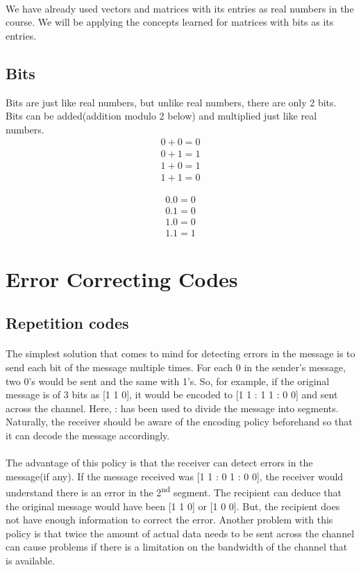 \documentclass[11pt,a4paper]{article}
\begin{document}
\paragraph{}
We have already used vectors and matrices with its entries as real numbers in the course. We will be applying the concepts learned for matrices with bits as its entries. 
\subsection{Bits}
Bits are just like real numbers, but unlike real numbers, there are only 2 bits. Bits can be added(addition modulo 2 below) and multiplied just like real numbers.\\
$$
\begin{aligned}
    0 + 0 = 0\\
    0 + 1 = 1\\
    1 + 0 = 1\\
    1 + 1 = 0
\end{aligned}
\label{eq: logical 1}
$$

$$
\begin{aligned}
    0.0 = 0\\
    0.1 = 0\\
    1.0 = 0\\
    1.1 = 1
\end{aligned}
\label{eq: logical 1}
$$

\section{Error Correcting Codes}

\subsection{Repetition codes}
\paragraph{}
The simplest solution that comes to mind for detecting errors in the message is to send each bit of the message multiple times. For each 0 in the sender's message, two 0's would be sent and the same with 1's. So, for example, if the original message is of 3 bits as [1 1 0], it would be encoded to [1 1 : 1 1 : 0 0] and sent across the channel. Here, : has been used to divide the message into segments. Naturally, the receiver should be aware of the encoding policy beforehand so that it can decode the message accordingly.
\paragraph{}
The advantage of this policy is that the receiver can detect errors in the message(if any). If the message received was [1 1 : 0 1 : 0 0], the receiver would understand there is an error in the 2\textsuperscript{nd} segment. The recipient can deduce that the original message would have been [1 1 0] or [1 0 0]. But, the recipient does not have enough information to correct the error. Another problem with this policy is that twice the amount of actual data needs to be sent across the channel can cause problems if there is a limitation on the bandwidth of the channel that is available.
\end{document}
